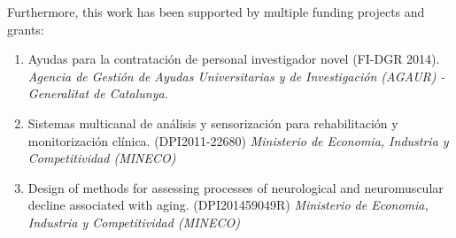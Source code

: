 Furthermore, this work has been supported by multiple funding projects and grants:

\begin{enumerate}
\item Ayudas para la contratación de personal investigador novel (FI-DGR 2014). \emph{Agencia de Gestión de Ayudas Universitarias y de Investigación (AGAUR) - Generalitat de Catalunya.}

\item 	Sistemas multicanal de análisis y sensorización para rehabilitación y monitorización clínica. (DPI2011-22680) \emph{Ministerio de Economia, Industria y Competitividad (MINECO)}

\item 	Design of methods for assessing processes of neurological and neuromuscular decline associated with aging. (DPI201459049R) \emph{Ministerio de Economia, Industria y Competitividad (MINECO)}


\end{enumerate}
